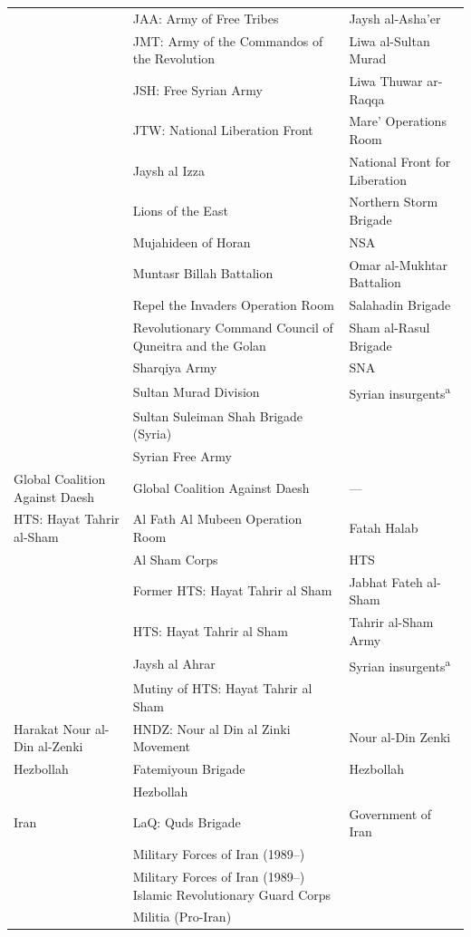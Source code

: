 \begin{longtable}{@{}>{\raggedright\arraybackslash}p{3.15cm} >{\raggedright\arraybackslash}p{6.15cm} >{\raggedright\arraybackslash}p{6.15cm}@{}}
 & JAA: Army of Free Tribes & Jaysh al-Asha'er \\
 & JMT: Army of the Commandos of the Revolution & Liwa al-Sultan Murad \\
 & JSH: Free Syrian Army & Liwa Thuwar ar-Raqqa \\
 & JTW: National Liberation Front & Mare' Operations Room \\
 & Jaysh al Izza & National Front for Liberation \\
 & Lions of the East & Northern Storm Brigade \\
 & Mujahideen of Horan & NSA \\
 & Muntasr Billah Battalion & Omar al-Mukhtar Battalion \\
 & Repel the Invaders Operation Room & Salahadin Brigade \\
 & Revolutionary Command Council of Quneitra and the Golan & Sham al-Rasul Brigade \\
 & Sharqiya Army & SNA \\
 & Sultan Murad Division & Syrian insurgents\textsuperscript{a} \\
 & Sultan Suleiman Shah Brigade (Syria) &  \\
 & Syrian Free Army &  \\
\hline
Global Coalition Against Daesh & Global Coalition Against Daesh & --- \\
\hline
HTS: Hayat Tahrir al-Sham & Al Fath Al Mubeen Operation Room & Fatah Halab \\
 & Al Sham Corps & HTS \\
 & Former HTS: Hayat Tahrir al Sham & Jabhat Fateh al-Sham \\
 & HTS: Hayat Tahrir al Sham & Tahrir al-Sham Army \\
 & Jaysh al Ahrar & Syrian insurgents\textsuperscript{a} \\
 & Mutiny of HTS: Hayat Tahrir al Sham &  \\
\hline
Harakat Nour al-Din al-Zenki & HNDZ: Nour al Din al Zinki Movement & Nour al-Din Zenki \\
\hline
Hezbollah & Fatemiyoun Brigade & Hezbollah \\
 & Hezbollah &  \\
\hline
Iran & LaQ: Quds Brigade & Government of Iran \\
 & Military Forces of Iran (1989--) &  \\
 & Military Forces of Iran (1989--) Islamic Revolutionary Guard Corps &  \\
 & Militia (Pro-Iran) &  \\

\end{longtable}
